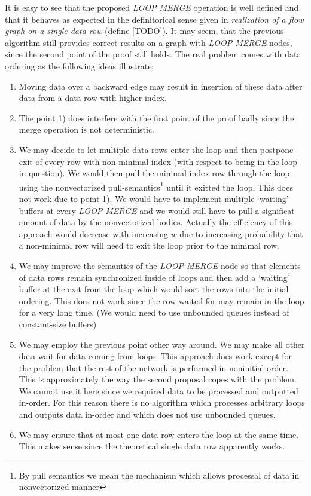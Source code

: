 It is easy to see that the proposed \emph{LOOP MERGE} operation is well defined and that it behaves as expected in the definitorical sense given in \emph{realization of a flow graph on a single data row} (define \ref{TODO}). It may seem, that the previous algorithm still provides correct results on a graph with \emph{LOOP MERGE} nodes, since the second point of the proof still holds. The real problem comes with data ordering as the following ideas illustrate:
\begin{enumerate}
    \item Moving data over a backward edge may result in insertion of these data after data from a data row with higher index. 
    \item The point 1) does interfere with the first point of the proof badly since the merge operation is not deterministic. 
    \item We may decide to let multiple data rows enter the loop and then postpone exit of every row with non-minimal index (with respect to being in the loop in question). We would then pull the minimal-index row through the loop using the nonvectorized pull-semantics\footnote{By pull semantics we mean the mechanism which allows processal of data in nonvectorized manner} until it exitted the loop. This does not work due to point 1). We would have to implement multiple `waiting' buffers at every \emph{LOOP MERGE} and we would still have to pull a significat amount of data by the nonvectorized bodies. Actually the efficiency of this approach would decrease with increasing $w$ due to increasing probability that a non-minimal row will need to exit the loop prior to the minimal row.
    \item We may improve the semantics of the \emph{LOOP MERGE} node so that elements of data rows remain synchronized inside of loops and then add a `waiting' buffer at the exit from the loop which would sort the rows into the initial ordering. This does not work since the row waited for may remain in the loop for a very long time. (We would need to use unbounded queues instead of constant-size buffers)
    \item We may employ the previous point other way around. We may make all other data wait for data coming from loops. This approach does work except for the problem that the rest of the network is performed in noninitial order. This is approximately the way the second proposal copes with the problem. We cannot use it here since we required data to be processed and outputted in-order. For this reason there is no algorithm which processes arbitrary loops and outputs data in-order and which does not use unbounded queues.
    \item We may ensure that at most one data row enters the loop at the same time. This makes sense since the theoretical single data row apparently works. 
\end{enumerate}

